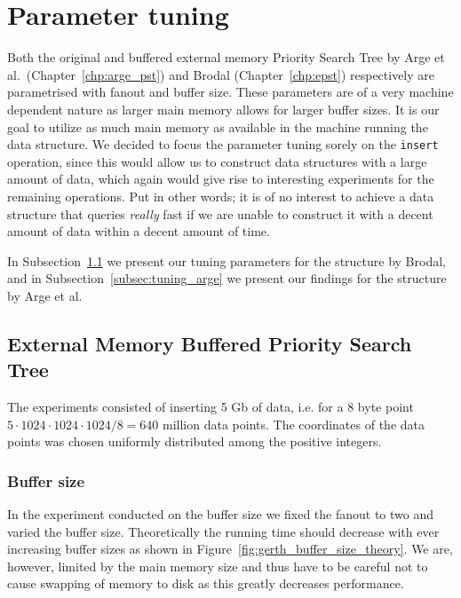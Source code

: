 \documentclass[twoside,11pt,openright]{report}
\begin{document}
\section{Parameter tuning}
Both the original and buffered external memory Priority Search Tree by Arge et al.~(Chapter~\ref{chp:arge_pst}) and Brodal (Chapter~\ref{chp:epst}) respectively are parametrised with fanout and buffer size. These parameters are of a very machine dependent nature as larger main memory allows for larger buffer sizes. It is our goal to utilize as much main memory as available in the machine running the data structure. We decided to focus the parameter tuning sorely on the \texttt{insert} operation, since this would allow us to construct data structures with a large amount of data, which again would give rise to interesting experiments for the remaining operations. Put in other words; it is of no interest to achieve a data structure that queries \textit{really} fast if we are unable to construct it with a decent amount of data within a decent amount of time.

In Subsection~\ref{subsec:tuning_gerth} we present our tuning parameters for the structure by Brodal, and in Subsection~\ref{subsec:tuning_arge} we present our findings for the structure by Arge et al.

\subsection{External Memory Buffered Priority Search Tree}
\label{subsec:tuning_gerth}
The experiments consisted of inserting 5 Gb of data, i.e. for a $8$ byte point $5 \cdot 1024 \cdot 1024 \cdot 1024 / 8 = 640$ million data points. The coordinates of the data points was chosen uniformly distributed among the positive integers. 

\subsubsection*{Buffer size}

In the experiment conducted on the buffer size we fixed the fanout to two and varied the buffer size. Theoretically the running time should decrease with ever increasing buffer sizes as shown in Figure~\ref{fig:gerth_buffer_size_theory}. We are, however, limited by the main memory size and thus have to be careful not to cause swapping of memory to disk as this greatly decreases performance. 
\end{document}

